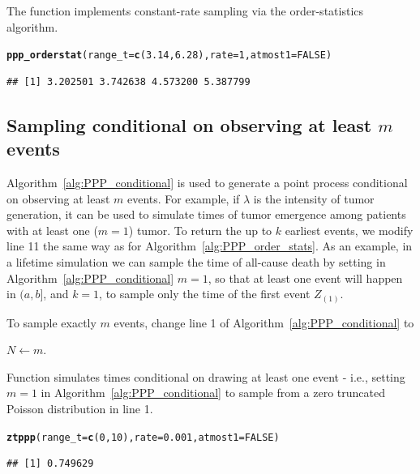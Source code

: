 \documentclass[article]{jss}\usepackage[]{graphicx}\usepackage[]{xcolor}
\makeatletter
\newcommand{\hlnum}[1]{\textcolor[rgb]{0.686,0.059,0.569}{#1}}%
\newcommand{\hlstd}[1]{\textcolor[rgb]{0.345,0.345,0.345}{#1}}%
\newcommand{\hlkwc}[1]{\textcolor[rgb]{0.333,0.667,0.333}{#1}}%
\newcommand{\hlkwd}[1]{\textcolor[rgb]{0.737,0.353,0.396}{\textbf{#1}}}%
\newenvironment{kframe}{%
 \def\at@end@of@kframe{}%
 \ifinner\ifhmode%
  \def\at@end@of@kframe{\end{minipage}}%
  \begin{minipage}{\columnwidth}%
 \fi\fi%
 \def\FrameCommand##1{\hskip\@totalleftmargin \hskip-\fboxsep
 \colorbox{shadecolor}{##1}\hskip-\fboxsep
     \hskip-\linewidth \hskip-\@totalleftmargin \hskip\columnwidth}%
 \MakeFramed {\advance\hsize-\width
   \@totalleftmargin\z@ \linewidth\hsize
   \@setminipage}}%
 {\par\unskip\endMakeFramed%
 \at@end@of@kframe}
\newenvironment{knitrout}{}{} %
\newcommand{\fct}[1]{\code{#1()}}
\makeatother
\begin{document}
The \fct{ppp\_orderstat} function implements constant-rate sampling via the order-statistics algorithm.

\begin{knitrout}
\color{fgcolor}\begin{kframe}
\begin{alltt}
\hlkwd{ppp_orderstat}\hlstd{(}\hlkwc{range_t} \hlstd{=} \hlkwd{c}\hlstd{(}\hlnum{3.14}\hlstd{,} \hlnum{6.28}\hlstd{),} \hlkwc{rate} \hlstd{=} \hlnum{1}\hlstd{,} \hlkwc{atmost1} \hlstd{=} \hlnum{FALSE}\hlstd{)}
\end{alltt}
\begin{verbatim}
## [1] 3.202501 3.742638 4.573200 5.387799
\end{verbatim}
\end{kframe}
\end{knitrout}

\subsection{Sampling conditional on observing at least $m$ events}\label{sec:PPP_order_stats}



Algorithm~\ref{alg:PPP_conditional} is used to generate a point process conditional on observing at least $m$ events. For example, if $\lambda$ is the intensity of tumor generation, it can be used to simulate times of tumor emergence among patients with at least one ($m=1$) tumor. To return the up to $k$ earliest events, we modify line 11 the same way as for Algorithm~\ref{alg:PPP_order_stats}. As an example, in a lifetime simulation we can sample the time of all-cause death by setting in Algorithm~\ref{alg:PPP_conditional} $m=1$, so that at least one event will happen in $(a, b]$, and $k = 1$, to sample only the time of the first event $Z_{(1)}$.

To sample exactly $m$ events, change line 1 of Algorithm~\ref{alg:PPP_conditional} to
\begin{center}
$N \gets m$.
\end{center}

Function \fct{ztppp} simulates times conditional on drawing at least one event - i.e., setting $m=1$ in Algorithm~\ref{alg:PPP_conditional} to sample from a zero truncated Poisson distribution in line 1.
\begin{knitrout}
\color{fgcolor}\begin{kframe}
\begin{alltt}
\hlkwd{ztppp}\hlstd{(}\hlkwc{range_t} \hlstd{=} \hlkwd{c}\hlstd{(}\hlnum{0}\hlstd{,} \hlnum{10}\hlstd{),} \hlkwc{rate} \hlstd{=} \hlnum{0.001}\hlstd{,} \hlkwc{atmost1} \hlstd{=} \hlnum{FALSE}\hlstd{)}
\end{alltt}
\begin{verbatim}
## [1] 0.749629
\end{verbatim}
\end{kframe}
\end{knitrout}
\end{document}
